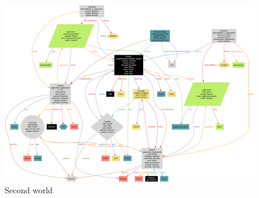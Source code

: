 \begin{figure}[h]
    \centering
    \includegraphics[width=16cm]{images/example-worlds/second.png}
    \caption{Second world}
\end{figure}
